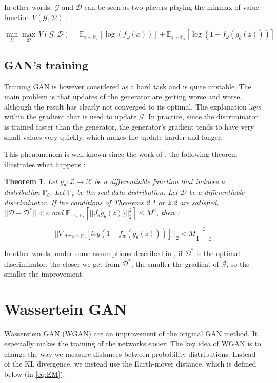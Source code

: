 \documentclass[a4paper]{report}
\newcommand{\G}{\mathcal{G}}
\newcommand{\D}{\mathcal{D}}
\newcommand{\X}{\mathcal{X}}
\newcommand{\Expec}{\mathbb{E}}
\newcommand{\Prob}{\mathbb{P}}
\theoremstyle{plain}
\newtheorem{thm}{Theorem}
\theoremstyle{remark}
\theoremstyle{definition}
\begin{document}
In other words, $\G$ and $\D$ can be seen as two players playing the minmax of value function $V(\G,\D)$ :

\begin{equation}
\label{eq:zero_sum_game}
\min_{\G} \max_{\D} \, V(\G,\D) = \Expec_{x \sim \Prob_r}[\log(f_\omega(x))] + \Expec_{z \sim \Prob_z}[\log(1 - f_\omega(g_\theta(z)))]
\end{equation}

\section{GAN's training}
\label{sec:vanish}
Training GAN is however considered as a hard task and is quite unstable. The main problem is that updates of the generator are getting worse and worse, although the result has clearly not converged to its optimal. The explanation lays within the gradient that is used to update $\G$. In practice, since the discriminator is trained faster than the generator, the generator's gradient tends to have very small values very quickly, which makes the update harder and longer.

This phenomenom is well known since the work of \cite{arjovsky2017towards}. the following theorem illustrates what happens :

\begin{thm}
Let $g_\theta : \mathcal{Z} \rightarrow \X$ be a differentiable function that induces  a  distribution $\Prob_\theta$. Let $\Prob_r$ be  the  real  data  distribution. Let $\D$ be a differentiable discriminator.  If the conditions of Theorems 2.1 or 2.2 are satisfied, $||\D - \D^*|| < \varepsilon$ and $\Expec_{z \sim \Prob_z}[ ||J_\theta g_\theta(z))||^2_2] \leqslant M^2$, then :

$$ || \nabla_\theta \Expec_{z \sim \Prob_z} [log(1- f_w(g_\theta(z)))] ||_2  < M \frac{\varepsilon}{1-\varepsilon}$$ 
\end{thm}

In other words, under some assumptions described in \cite{arjovsky2017wasserstein}, if $\D^*$ is the optimal discriminator, the closer we get from $\D^*$, the smaller the gradient of $\G$, so the smaller the improvement.

\chapter{Wassertein GAN}

Wasserstein GAN (WGAN) are an improvement of the original GAN method. It especially makes the training of the networks easier. The key idea of WGAN is to change the way we measure distances between probability distributions. Instead of the KL divergence, we instead use the Earth-mover distance, which is defined below (in \ref{eq:EM}).
\end{document}
